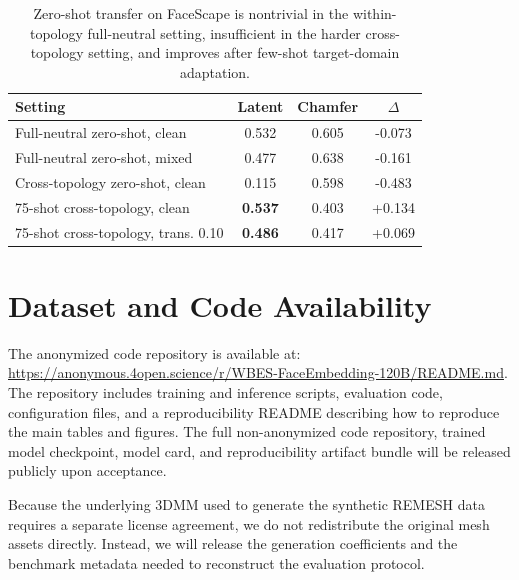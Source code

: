 \documentclass{article}
\begin{document}
\begin{table}[!ht]
\centering
\small
\caption{Zero-shot transfer on FaceScape is nontrivial in the within-topology full-neutral setting, insufficient in the harder cross-topology setting, and improves after few-shot target-domain adaptation.}
\label{tab:faceverse_summary}
\begin{tabular}{lccc}
\toprule
Setting & Latent & Chamfer & $\Delta$ \\
\midrule
Full-neutral zero-shot, clean & 0.532 & 0.605 & -0.073 \\
Full-neutral zero-shot, mixed & 0.477 & 0.638 & -0.161 \\
Cross-topology zero-shot, clean & 0.115 & 0.598 & -0.483 \\
75-shot cross-topology, clean & \textbf{0.537} & 0.403 & +0.134 \\
75-shot cross-topology, trans. 0.10 & \textbf{0.486} & 0.417 & +0.069 \\
\bottomrule
\end{tabular}
\end{table}


\section{Dataset and Code Availability}
\label{sec:availability}

The anonymized code repository is available at:
\url{https://anonymous.4open.science/r/WBES-FaceEmbedding-120B/README.md}.
The repository includes training and inference scripts, evaluation code,
configuration files, and a reproducibility README describing how to reproduce the
main tables and figures. The full non-anonymized code repository, trained model checkpoint, model card,
and reproducibility artifact bundle will be released publicly upon acceptance.

Because the underlying 3DMM used to generate the synthetic REMESH data
requires a separate license agreement, we do not redistribute the original mesh
assets directly. Instead, we will release the generation coefficients and the
benchmark metadata needed to reconstruct the evaluation protocol. 
\end{document}
